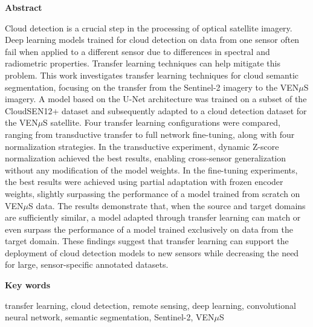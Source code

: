 
\addchaptertocentry{\abstractname}
\thispagestyle{plain}
\null\vfil
\begin{center}
{\huge\bfseries{Abstract} \par}
\bigskip
\end{center}
Cloud detection is a crucial step in the processing of optical satellite imagery. Deep learning models trained for cloud detection on data from one sensor often fail when applied to a different sensor due to differences in spectral and radiometric properties. Transfer learning techniques can help mitigate this problem. This work investigates transfer learning techniques for cloud semantic segmentation, focusing on the transfer from the Sentinel-2 imagery to the VEN$\mu$S imagery. A model based on the U-Net architecture was trained on a subset of the CloudSEN12+ dataset and subsequently adapted to a cloud detection dataset for the VEN$\mu$S satellite. Four transfer learning configurations were compared, ranging from transductive transfer to full network fine-tuning, along with four normalization strategies. In the transductive experiment, dynamic Z-score normalization achieved the best results, enabling cross-sensor generalization without any modification of the model weights. In the fine-tuning experiments, the best results were achieved using partial adaptation with frozen encoder weights, slightly surpassing the performance of a model trained from scratch on VEN$\mu$S data. The results demonstrate that, when the source and target domains are sufficiently similar, a model adapted through transfer learning can match or even surpass the performance of a model trained exclusively on data from the target domain. These findings suggest that transfer learning can support the deployment of cloud detection models to new sensors while decreasing the need for large, sensor-specific annotated datasets.

\begin{center}
{\large\bfseries{Key words} \par}
\bigskip
\end{center}
\noindent transfer learning, cloud detection, remote sensing, deep learning, convolutional neural network, semantic segmentation, Sentinel-2, VEN$\mu$S

